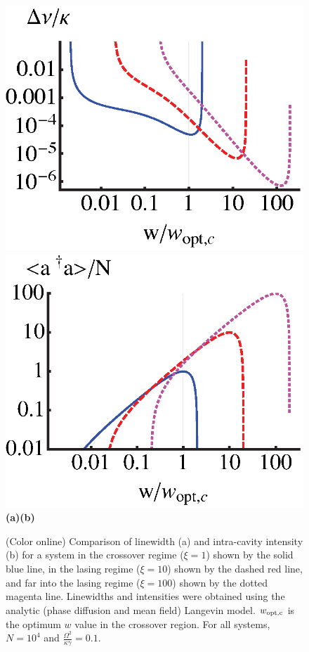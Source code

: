 \documentclass[aps,
twocolumn,
showpacs,
superscriptaddress,groupedaddress]{revtex4}
\begin{document}
\begin{figure}
\begin{center}
	\includegraphics[scale =0.415] {LinewidthComparisonLangevin.eps}
	\hspace{-4mm} \includegraphics[scale =0.415] {adaComparisonLangevin.eps}\\
	\hspace{6mm}\textbf{(a)}\hspace{37mm}\textbf{(b)} \hspace{35mm}
\end{center}
		\vspace{-5mm}
\caption{(Color online) Comparison of linewidth (a) and intra-cavity
intensity (b) for a system in the crossover regime ($\xi=1$) shown by
the solid blue line, in the lasing regime ($\xi=10$) shown by the dashed
red line, and far into the lasing regime ($\xi=100$) shown by the dotted
magenta line.  Linewidths and intensities were obtained using the
analytic (phase diffusion and mean field) Langevin model. $w_{\rm
opt,c}$ is the optimum $w$ value in the crossover region. For all
systems, $N=10^4$ and $\frac{\Omega^2}{\kappa \gamma}=0.1$.}
\label{LWadaComparison}
\end{figure}
\end{document}
